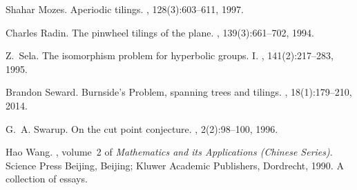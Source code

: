 \documentclass[12pt,reqno]{amsart}
\theoremstyle{plain}
\theoremstyle{definition}
\numberwithin{subcase}{case}
\theoremstyle{plain}
\theoremstyle{definition}
\begin{document}
\begin{thebibliography}{10}
Shahar Mozes.
\newblock Aperiodic tilings.
, 128(3):603--611, 1997.

Charles Radin.
\newblock The pinwheel tilings of the plane.
, 139(3):661--702, 1994.

Z.~Sela.
\newblock The isomorphism problem for hyperbolic groups. {I}.
, 141(2):217--283, 1995.

Brandon Seward.
\newblock Burnside's {P}roblem, spanning trees and tilings.
, 18(1):179--210, 2014.

G.~A. Swarup.
\newblock On the cut point conjecture.
, 2(2):98--100, 1996.

Hao Wang.
, volume~2 of {\em Mathematics
  and its Applications (Chinese Series)}.
\newblock Science Press Beijing, Beijing; Kluwer Academic Publishers,
  Dordrecht, 1990.
\newblock A collection of essays.

\end{thebibliography}
\end{document}
